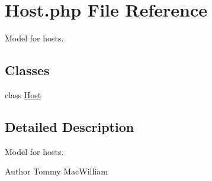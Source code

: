 \hypertarget{Host_8php}{
\section{\-Host.php \-File \-Reference}
\label{Host_8php}
}


\-Model for hosts.  


\subsection*{\-Classes}
\begin{DoxyCompactItemize}
\item 
class \hyperlink{classHost}{\-Host}
\end{DoxyCompactItemize}


\subsection{\-Detailed \-Description}
\-Model for hosts. \begin{DoxyAuthor}{\-Author}
\-Tommy \-Mac\-William 
\end{DoxyAuthor}
